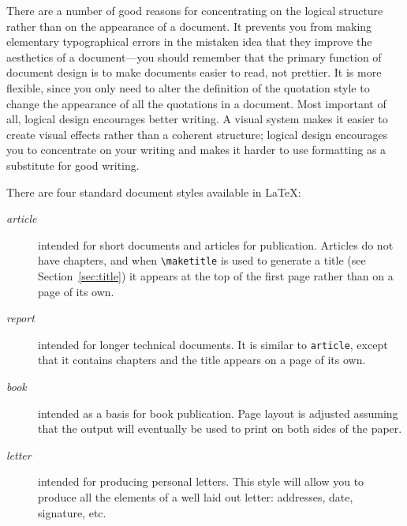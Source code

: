 There are a number of good reasons for concentrating on the logical
structure rather than on the appearance of a document.  It prevents
you from making elementary typographical errors in the mistaken
idea that they improve the aesthetics of a document---you should
remember that the primary function of document design is to make
documents easier to read, not prettier.  It is more flexible, since
you only need to alter the definition of the quotation style
to change the appearance of all the quotations in a document.  Most
important of all, logical design encourages better writing.
A visual system makes it easier to create visual effects rather than
a coherent structure; logical design encourages you to concentrate on
your writing and makes it harder to use formatting as a substitute
for good writing.
 
There are four standard document styles available in \LaTeX:
\nobreak
\begin{description}
 
\item[{\em article}] intended for short documents and articles for
publication.
Articles do not have chapters, and when \verb+\maketitle+ is used to
generate a title (see Section~\ref{sec:title}) it appears at the top
of the first page rather than on a page of its own.
 
\item[{\em report}] intended for longer technical documents.
It is similar to {\tt article}, except that
it contains chapters and the title appears on a page of its own.
 
\item[{\em book}] intended as a basis for book publication.
Page layout is
adjusted assuming that the output will eventually be used to print on
both sides of the paper.
 
\item[{\em letter}] intended for producing personal letters.  This style
will allow you to produce all the elements of a well laid out letter:
addresses, date, signature, etc.
\end{description}
 
